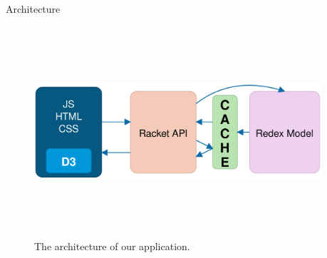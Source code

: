 \documentclass[final]{beamer}
\newlength{\sepwidth}
\newlength{\colwidth}
\newcommand{\separatorcolumn}{\begin{column}{\sepwidth}\end{column}}
\begin{document}
\begin{frame}[t]
\begin{columns}[t]
\begin{column}{\colwidth}
\begin{block}{Architecture}
\begin{figure}[htbp]
	\includegraphics[height=7.8cm]{picts/architecture.pdf}
\caption{The architecture of our application.}
\label{fig:architecture}
\end{figure}

\end{block}

\end{column}

\separatorcolumn
\end{columns}
\end{frame}
\end{document}
